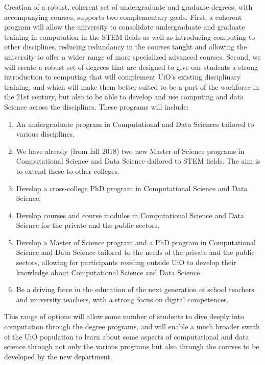 \documentclass[oneside,final,10pt]{article}
\begin{document}
Creation of a robust, coherent set of undergraduate and graduate degrees, with accompanying
courses, supports two complementary goals. First, a coherent program will allow the university
to consolidate undergraduate and graduate training in computation in the STEM fields as well as introducing computing to other disciplines, reducing
redundancy in the courses taught and allowing the university to offer a wider range of more
specialized advanced courses. Second, we will create a robust set of degrees that are designed to give our 
students a strong introduction to computing
that will complement UiO’s existing disciplinary training, and which will make them better suited
to be a part of the workforce in the 21st century, but also to be able to develop and use computing and data Science across the disciplines. These programs will include:
\begin{enumerate}
\item An undergraduate program in Computational and Data Sciences tailored to various disciplines.

\item We have already (from fall 2018) two new Master of Science programs in Computational Science and Data Science dailored to STEM fields. The aim is to extend these to other colleges.

\item Develop a cross-college PhD program in Computational Science and Data Science.

\item Develop courses and course modules in Computational Science and Data Science for the private and the public sectors.

\item Develop a Master of Science program and a PhD program in Computational Science and Data Science tailored to the needs of the private and the public sectors, allowing for participants residing outside UiO to develop their knowledge about Computational Science and Data Science.

\item Be a driving force in the education of  the next generation of school teachers and university teachers,  with a strong focus on digital competences. 
\end{enumerate}

\noindent
This range of options will allow some number of students to dive deeply into
computation through the degree programs, and will enable a much broader swath of the UiO
population to learn about some aspects of computational and data science through not only the various programs but also through the courses to be developed by the new department. 
\end{document}
